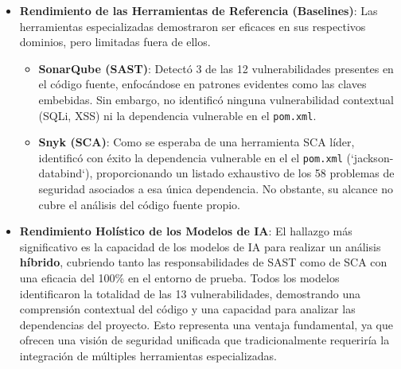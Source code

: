 \begin{itemize}
    \item \textbf{Rendimiento de las Herramientas de Referencia (Baselines)}: Las herramientas especializadas demostraron ser eficaces en sus respectivos dominios, pero limitadas fuera de ellos.
        \begin{itemize}
            \item \textbf{SonarQube (SAST)}: Detectó 3 de las 12 vulnerabilidades presentes en el código fuente, enfocándose en patrones evidentes como las claves embebidas. Sin embargo, no identificó ninguna vulnerabilidad contextual (SQLi, XSS) ni la dependencia vulnerable en el \texttt{pom.xml}.
            \item \textbf{Snyk (SCA)}: Como se esperaba de una herramienta SCA líder, identificó con éxito la dependencia vulnerable en el el \texttt{pom.xml} (`jackson-databind`), proporcionando un listado exhaustivo de los 58 problemas de seguridad asociados a esa única dependencia. No obstante, su alcance no cubre el análisis del código fuente propio.
        \end{itemize}

    \item \textbf{Rendimiento Holístico de los Modelos de IA}: El hallazgo más significativo es la capacidad de los modelos de IA para realizar un análisis \textbf{híbrido}, cubriendo tanto las responsabilidades de SAST como de SCA con una eficacia del 100\% en el entorno de prueba. Todos los modelos identificaron la totalidad de las 13 vulnerabilidades, demostrando una comprensión contextual del código y una capacidad para analizar las dependencias del proyecto. Esto representa una ventaja fundamental, ya que ofrecen una visión de seguridad unificada que tradicionalmente requeriría la integración de múltiples herramientas especializadas.


\end{itemize}
